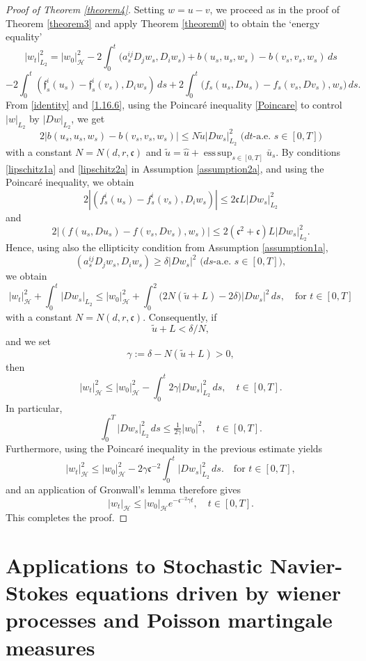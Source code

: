\documentclass[11pt,reqno]{amsart}
\newcommand{\mysection}[1]{\section{#1}

      \setcounter{equation}{0}}
\DeclareMathOperator*{\esssup}{ess\,sup}
\theoremstyle{definition}
\theoremstyle{remark}
\newcommand\frc{\mathfrak{c}}
\newcommand\frf{\mathfrak{f}}
\newcommand\cH{\mathcal{H}}
\newcommand{\<}{\langle}
\renewcommand{\>}{\rangle}
\begin{document}
\medskip
\begin{proof}[Proof of Theorem \ref{theorem4}]
Setting $w=u-v$, we proceed as in the proof of Theorem \ref{theorem3} and apply 
Theorem \ref{theorem0} to obtain the `energy equality' 
$$
|w_t|_{L_2}^2=|w_0|_{\cH}^2-2\int_0^t
\big(a_s^{ij}D_j w_s, D_iw_s\big)+b(u_s,u_s,w_s)-b(v_s,v_s,w_s)\,ds
$$
$$
-2\int_0^t
(\frf^i_s(u_s)-\frf_s^i(v_s),D_iw_s)\,ds+2\int_0^t\big(f_s(u_s,Du_s)-f_s(v_s,Dv_s),w_s\big)\,ds.                                       
$$
From \eqref{identity} and \eqref{1.16.6}, using the Poincar\'e inequality \eqref{Poincare}
to control $|w|_{L_2}$ by $|Dw|_{L_2}$, we get
$$
2|b(u_s,u_s,w_s)-b(v_s,v_s,w_s)|
\leq N\tilde u|Dw_s|_{L_2}^2\,\,\text{($dt$-a.e. $s\in[0,T]$)} 
$$
with a constant $N=N(d,r,\frc)$ and $\tilde u=\hat u+\esssup_{s\in[0,T]}\bar u_s$.  
By conditions  \eqref{lipschitz1a} and \eqref{lipschitz2a} 
in Assumption \ref{assumption2a}, and using the Poincar\'e inequality,  
we obtain 
$$
2|(f_s^i(u_s)-f_s^i(v_s),D_i w_s)|
\leq 2\frc L|Dw_s|^2_{L_2}
$$
and 
$$
2|(f(u_s,Du_s)-f(v_s,Dv_s),w_s)|
\leq 2(\frc^2+\frc)L|Dw_s|^2_{L_2}. 
$$
Hence, using also the ellipticity condition from Assumption \ref{assumption1a},  
$$
(a_s^{ij}D_jw_s,D_iw_s)\geq \delta |Dw_s|^2\,\, \text{($ds$-a.e. $s\in[0,T]$)},   
$$
we obtain 
$$
|w_t|^2_{\cH}+\int_0^t|Dw_s|_{L_2}\leq |w_0|_{\cH}^2
+\int_0^2\big(2N(\tilde u+L)-2\delta\big)|Dw_s|^2\,ds,\quad \text{for $t\in[0,T]$}  
$$
with a constant $N=N(d,r,\frc)$. 
Consequently, if 
$$
\tilde u+L<\delta/N, 
$$ 
and we set 
$$
\gamma:=\delta -N(\tilde u+L)>0, 
$$
then 
$$
|w_t|^2_{\cH}\leq |w_0|_{\cH}^2
-\int_0^t 2\gamma |Dw_s|^2_{L_2}\,ds,   
\quad t\in[0,T].
$$
In particular, 
$$
\int_0^T |Dw_s|^2_{L_2}\,ds\leq \tfrac{1}{2\gamma}|w_0|^2,  
\quad t\in[0,T].  
$$
Furthermore, using the Poincar\'e inequality in the previous estimate yields 
$$
|w_t|^2_{\cH}\leq |w_0|_{\cH}^2
-2\gamma\frc^{-2}\int_0^t  |Dw_s|^2_{L_2}\,ds.  
\quad \text{for $t\in[0,T]$}, 
$$
and an application of Gronwall's lemma therefore gives 
$$
|w_t|_{\cH}\leq |w_0|_{\cH}e^{-\frc^{-2}\gamma t}, \quad t\in [0,T].    
$$
This completes the proof. 
\end{proof}

\mysection{Applications to Stochastic Navier-Stokes equations 
driven by wiener processes and 
Poisson martingale measures}
\end{document}
